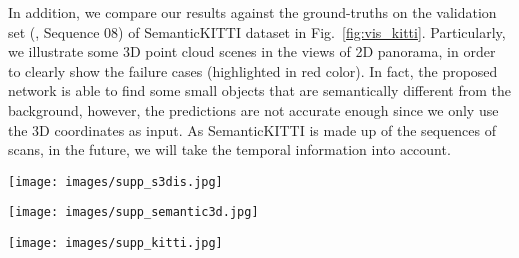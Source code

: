 \documentclass[10pt,twocolumn,letterpaper]{article}
\begin{document}
In addition, we compare our results against the ground-truths on the validation set (\ie, Sequence 08) of SemanticKITTI dataset in Fig.~\ref{fig:vis_kitti}. Particularly, we illustrate some 3D point cloud scenes in the views of 2D panorama, in order to clearly show the failure cases (highlighted in red color). In fact, the proposed network is able to find some small objects that are semantically different from the background, however, the predictions are not accurate enough since we only use the 3D coordinates as input. As SemanticKITTI is made up of the sequences of scans, in the future, we will take the temporal information into account.

\clearpage
\begin{figure*}
\begin{center}
\texttt{[image: images/supp\_s3dis.jpg]}
\end{center}
\caption{Examples of our semantic segmentation results of \emph{S3DIS}~\cite{armeni2017joint} dataset. The first column presents the input point cloud scenes (\enquote{Input}) of some indoor rooms. The second column shows the semantic segmentation predictions of our network (\enquote{Prediction}), while the last column indicates the ground-truths (\enquote{Ground-Truth}). The main differences are highlighted in red frames.}
\label{fig:vis_s3dis}
\end{figure*}

\clearpage
\begin{figure*}
\begin{center}
\texttt{[image: images/supp\_semantic3d.jpg]}
\end{center}
\caption{Examples of our semantic segmentation predictions of \emph{Semantic3D}~\cite{hackel2017semantic3d} dataset. The first row is about an urban square, the second one shows a rural farm, the third one illustrates a cathedral scene, and the last is scanned from a street view.}
\label{fig:vis_semantic3d}
\end{figure*}

\clearpage
\begin{figure*}
\begin{center}
\texttt{[image: images/supp\_kitti.jpg]}
\end{center}
\caption{Examples of our semantic segmentation predictions of \emph{SemanticKITTI}~\cite{behley2019semantickitti} dataset. The first two rows show the general 3D views of the input traffic scenarios (\enquote{Input}) and our semantic segmentation outputs (\enquote{Output}), respectively. The remaining rows compare our predictions (\enquote{Ours}) and the ground-truths (\enquote{GT}) in 2D panorama views, where the failure cases are highlighted in red frames.}
\label{fig:vis_kitti}
\end{figure*}
\end{document}
